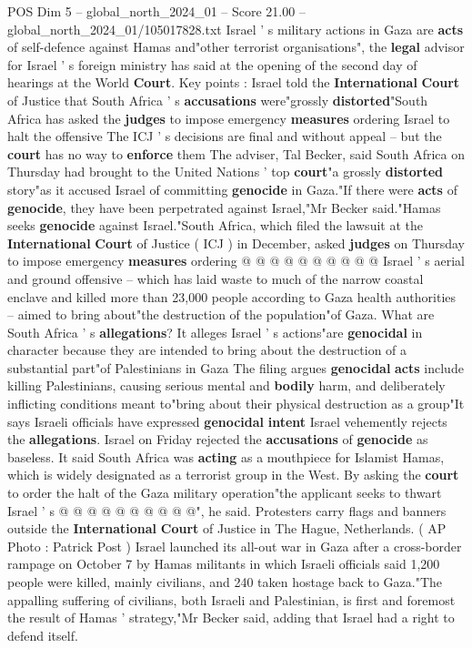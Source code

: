 \begin{textsample}{POS Dim 5 – global\_north\_2024\_01 – Score 21.00 – global\_north\_2024\_01/105017828.txt}  \label{ex:f5_pos_113}
Israel ' s military actions in Gaza are \textbf{acts} of self-defence against Hamas and"other terrorist organisations", the \textbf{legal} advisor for Israel ' s foreign ministry has said at the opening of the second day of hearings at the World \textbf{Court}.
Key points : Israel told the \textbf{International} \textbf{Court} of Justice that South Africa ' s \textbf{accusations} were"grossly \textbf{distorted}"South Africa has asked the \textbf{judges} to impose emergency \textbf{measures} ordering Israel to halt the offensive The ICJ ' s decisions are final and without appeal -- but the \textbf{court} has no way to \textbf{enforce} them The adviser, Tal Becker, said South Africa on Thursday had brought to the United Nations ' top \textbf{court}"a grossly \textbf{distorted} story"as it accused Israel of committing \textbf{genocide} in Gaza."If there were \textbf{acts} of \textbf{genocide}, they have been perpetrated against Israel,"Mr Becker said."Hamas seeks \textbf{genocide} against Israel."South Africa, which filed the lawsuit at the \textbf{International} \textbf{Court} of Justice ( ICJ ) in December, asked \textbf{judges} on Thursday to impose emergency \textbf{measures} ordering @ @ @ @ @ @ @ @ @ @ Israel ' s aerial and ground offensive -- which has laid waste to much of the narrow coastal enclave and killed more than 23,000 people according to Gaza health authorities -- aimed to bring about"the destruction of the population"of Gaza.
What are South Africa ' s \textbf{allegations}?
It alleges Israel ' s actions"are \textbf{genocidal} in character because they are intended to bring about the destruction of a substantial part"of Palestinians in Gaza The filing argues \textbf{genocidal} \textbf{acts} include killing Palestinians, causing serious mental and \textbf{bodily} harm, and deliberately inflicting conditions meant to"bring about their physical destruction as a group"It says Israeli officials have expressed \textbf{genocidal} \textbf{intent} Israel vehemently rejects the \textbf{allegations}.
Israel on Friday rejected the \textbf{accusations} of \textbf{genocide} as baseless.
It said South Africa was \textbf{acting} as a mouthpiece for Islamist Hamas, which is widely designated as a terrorist group in the West.
By asking the \textbf{court} to order the halt of the Gaza military operation"the applicant seeks to thwart Israel ' s @ @ @ @ @ @ @ @ @ @", he said.
Protesters carry flags and banners outside the \textbf{International} \textbf{Court} of Justice in The Hague, Netherlands. ( AP Photo : Patrick Post ) Israel launched its all-out war in Gaza after a cross-border rampage on October 7 by Hamas militants in which Israeli officials said 1,200 people were killed, mainly civilians, and 240 taken hostage back to Gaza."The appalling suffering of civilians, both Israeli and Palestinian, is first and foremost the result of Hamas ' strategy,"Mr Becker said, adding that Israel had a right to defend itself.

\end{textsample}
